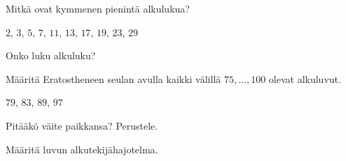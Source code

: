 \begin{tehtavasivu}

\begin{tehtava}
    Mitkä ovat kymmenen pienintä alkulukua?
    
    \begin{vastaus}
        $2$, $3$, $5$, $7$, $11$, $13$, $17$, $19$, $23$, $29$
    \end{vastaus}
    
\end{tehtava}

\begin{tehtava}
    Onko luku
    alkuluku?
    
    \begin{vastaus}
    \end{vastaus}
    
\end{tehtava}

\begin{tehtava}
    Määritä Eratostheneen seulan avulla kaikki välillä $75,\ldots, 100$ olevat alkuluvut.

    \begin{vastaus}
        $79$, $83$, $89$, $97$
    \end{vastaus}
    
\end{tehtava}

\begin{tehtava}
    Pitääkö väite paikkansa? Perustele.
     

    \begin{vastaus}
    \end{vastaus}
    
\end{tehtava}

\begin{tehtava}
    Määritä luvun alkutekijähajotelma.
    

\end{tehtava}
\end{tehtavasivu}
